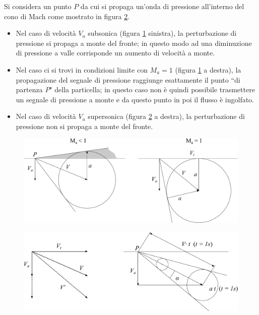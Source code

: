 Si considera un punto $P$ da cui si propaga un'onda di pressione all'interno del cono di Mach come mostrato in figura \ref{fd:bloccson1}.
\begin{itemize}
	\item Nel caso di velocità $V_a$ subsonica (figura \ref{fd:bloccson2} sinistra), la perturbazione di pressione si propaga a monte del fronte; in questo modo ad una diminuzione di pressione a valle corrisponde un aumento di velocità a monte.
	\item Nel caso ci si trovi in condizioni limite con $M_a=1$ (figura \ref{fd:bloccson2} a destra), la propagazione del segnale di pressione raggiunge esattamente il punto ``di partenza $P$" della particella; in questo caso non è quindi possibile trasmettere un segnale di pressione a monte e da questo punto in poi il flusso è ingolfato.
	\item Nel caso di velocità $V_a$ supersonica (figura \ref{fd:bloccson1} a destra), la perturbazione di pressione non si propaga a monte del fronte.
\end{itemize} 
\begin{figure}[h!]
\centering
  \includegraphics[width=.8\textwidth]{fig/bloccson2.pdf}
\caption{}
\label{fd:bloccson2}
\end{figure}
\begin{figure}[h!]
\centering
  \includegraphics[width=.8\textwidth]{fig/bloccson1.pdf}
\caption{}
\label{fd:bloccson1}
\end{figure}
